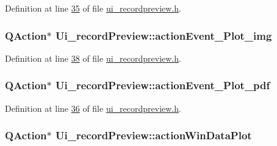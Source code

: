 Definition at line \hyperlink{a00140_source_l00035}{35} of file \hyperlink{a00140_source}{ui\+\_\+recordpreview.\+h}.

\hypertarget{a00081_a789f5466c7f1781c13d4d027e982ca55}{
\subsubsection[{action\+Event\+\_\+\+Plot\+\_\+img}]{\setlength{\rightskip}{0pt plus 5cm}Q\+Action$\ast$ Ui\+\_\+record\+Preview\+::action\+Event\+\_\+\+Plot\+\_\+img}}\label{a00081_a789f5466c7f1781c13d4d027e982ca55}


Definition at line \hyperlink{a00140_source_l00038}{38} of file \hyperlink{a00140_source}{ui\+\_\+recordpreview.\+h}.

\hypertarget{a00081_a4369770edbf9cb6131a066ca10b3f863}{
\subsubsection[{action\+Event\+\_\+\+Plot\+\_\+pdf}]{\setlength{\rightskip}{0pt plus 5cm}Q\+Action$\ast$ Ui\+\_\+record\+Preview\+::action\+Event\+\_\+\+Plot\+\_\+pdf}}\label{a00081_a4369770edbf9cb6131a066ca10b3f863}


Definition at line \hyperlink{a00140_source_l00036}{36} of file \hyperlink{a00140_source}{ui\+\_\+recordpreview.\+h}.

\hypertarget{a00081_aa09067a9c96c9cd78f75261a9fcb89f0}{
\subsubsection[{action\+Win\+Data\+Plot}]{\setlength{\rightskip}{0pt plus 5cm}Q\+Action$\ast$ Ui\+\_\+record\+Preview\+::action\+Win\+Data\+Plot}}\label{a00081_aa09067a9c96c9cd78f75261a9fcb89f0}



